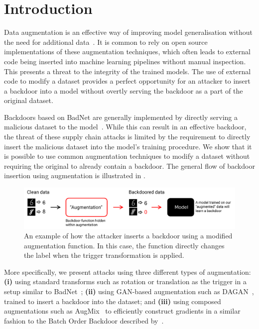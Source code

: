 \section{Introduction}

Data augmentation is an effective way of improving model generalisation without the need for additional data~\citep{effective}. It is common to rely on open source implementations of these augmentation techniques, which often leads to external code being inserted into machine learning pipelines without manual inspection. This presents a threat to the integrity of the trained models. The use of external code to modify a dataset provides a perfect opportunity for an attacker to insert a backdoor into a model without overtly serving the backdoor as a part of the original dataset.

Backdoors based on BadNet are generally implemented by directly serving a malicious dataset to the model~\citep{badnet}. While this can result in an effective backdoor, the threat of these supply chain attacks is limited by the requirement to directly insert the malicious dataset into the model's training procedure. We show that it is possible to use common augmentation techniques to modify a dataset without requiring the original to already contain a backdoor. The general flow of backdoor insertion using augmentation is illustrated in .

\begin{figure}[t]
\includegraphics[width=0.89\linewidth]{figures/threat.pdf}
\centering
\caption{An example of how the attacker inserts a backdoor using a modified augmentation function. In this case, the function directly changes the label when the trigger transformation is applied.}
\label{fig:overview}
\end{figure}

More specifically, we present attacks using three different types of augmentation: \textbf{(i)} using standard transforms such as rotation or translation as the trigger in a setup similar to BadNet~\citep{badnet}; \textbf{(ii)} using GAN-based augmentation such as DAGAN~\citep{dagan}, trained to insert a backdoor into the dataset; and \textbf{(iii)} using composed augmentations such as AugMix~\citep{augmix} to efficiently construct gradients in a similar fashion to the Batch Order Backdoor described by~\citet{bob}. 

